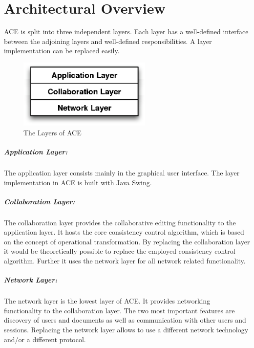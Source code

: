 \chapter{Architectural Overview}


ACE is split into three independent layers. Each layer has a well-defined 
interface between the adjoining layers and well-defined responsibilities. 
A layer implementation can be replaced easily.

\begin{figure}[H]
 \centering
 \includegraphics[width=6.6cm,height=3.42cm]{../images/layers.eps}
 \caption{The Layers of ACE}
\end{figure}

\paragraph{Application Layer:} The application layer consists mainly in the 
graphical user interface. The layer implementation in ACE is built with
Java Swing.

\paragraph{Collaboration Layer:} The collaboration layer provides the
collaborative editing functionality to the application layer. It hosts the core
consistency control algorithm, which is based on the concept of operational 
transformation. By replacing the collaboration layer it would be theoretically 
possible to replace the employed consistency control algorithm. Further it uses 
the network layer for all network related functionality.

\paragraph{Network Layer:} The network layer is the lowest layer of ACE. It 
provides networking functionality to the collaboration layer. The two most 
important features are discovery of users and documents as well as communication 
with other users and sessions. Replacing the network layer allows to use a 
different network technology and/or a different protocol.




